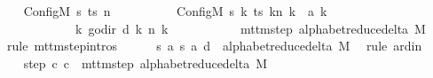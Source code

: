 \begin{isabellebody}
\ \ \isamarkupfalse%
\ {\isachardoublequoteopen}{\isacharparenleft}{\kern0pt}Config\isactrlsub M\ {\isacharquery}{\kern0pt}s\ ts\ n{\isacharcomma}{\kern0pt}\isanewline
\ \ \ \ \ \ \ \ \ \ Config\isactrlsub M\ {\isacharquery}{\kern0pt}s{\isacharprime}{\kern0pt}\ {\isacharparenleft}{\kern0pt}{\isasymlambda}k{\isachardot}{\kern0pt}\ {\isacharparenleft}{\kern0pt}ts\ k{\isacharparenright}{\kern0pt}{\isacharparenleft}{\kern0pt}n\ k\ {\isacharcolon}{\kern0pt}{\isacharequal}{\kern0pt}\ {\isacharquery}{\kern0pt}a{\isacharprime}{\kern0pt}\ k{\isacharparenright}{\kern0pt}{\isacharparenright}{\kern0pt}\isanewline
\ \ \ \ \ \ \ \ \ \ \ \ {\isacharparenleft}{\kern0pt}{\isasymlambda}k{\isachardot}{\kern0pt}\ go{\isacharunderscore}{\kern0pt}dir\ {\isacharparenleft}{\kern0pt}{\isacharquery}{\kern0pt}d\ k{\isacharparenright}{\kern0pt}\ {\isacharparenleft}{\kern0pt}n\ k{\isacharparenright}{\kern0pt}{\isacharparenright}{\kern0pt}{\isacharparenright}{\kern0pt}\isanewline
\ \ \ \ \ \ \ \ \ \ {\isasymin}\ mttm{\isacharunderscore}{\kern0pt}step\ {\isacharparenleft}{\kern0pt}alphabet{\isacharunderscore}{\kern0pt}reduce{\isacharunderscore}{\kern0pt}delta\ M{\isacharparenright}{\kern0pt}{\isachardoublequoteclose}\isanewline
\ \ \isamarkupfalse%
\ {\isacharparenleft}{\kern0pt}rule\ mttm{\isacharunderscore}{\kern0pt}step{\isachardot}{\kern0pt}intros{\isacharparenright}{\kern0pt}\isanewline
\ \ \ \ \isamarkupfalse%
\ {\isachardoublequoteopen}{\isacharparenleft}{\kern0pt}{\isacharquery}{\kern0pt}s{\isacharcomma}{\kern0pt}\ {\isacharquery}{\kern0pt}a{\isacharcomma}{\kern0pt}\ {\isacharquery}{\kern0pt}s{\isacharprime}{\kern0pt}{\isacharcomma}{\kern0pt}\ {\isacharquery}{\kern0pt}a{\isacharprime}{\kern0pt}{\isacharcomma}{\kern0pt}\ {\isacharquery}{\kern0pt}d{\isacharparenright}{\kern0pt}\ {\isasymin}\ alphabet{\isacharunderscore}{\kern0pt}reduce{\isacharunderscore}{\kern0pt}delta\ M{\isachardoublequoteclose}\ \isamarkupfalse%
\ {\isacharparenleft}{\kern0pt}rule\ ard{\isacharunderscore}{\kern0pt}in{\isacharparenright}{\kern0pt}\isanewline
\ \ \isamarkupfalse%
\isanewline
\ \ \isamarkupfalse%
\ step{\isacharcolon}{\kern0pt}\ {\isachardoublequoteopen}{\isacharparenleft}{\kern0pt}c{\isacharprime}{\kern0pt}{\isacharcomma}{\kern0pt}\ {\isacharquery}{\kern0pt}c{\isacharprime}{\kern0pt}{\isacharprime}{\kern0pt}{\isacharparenright}{\kern0pt}\ {\isasymin}\ mttm{\isacharunderscore}{\kern0pt}step\ {\isacharparenleft}{\kern0pt}alphabet{\isacharunderscore}{\kern0pt}reduce{\isacharunderscore}{\kern0pt}delta\ M{\isacharparenright}{\kern0pt}{\isachardoublequoteclose}\isanewline

\end{isabellebody}
